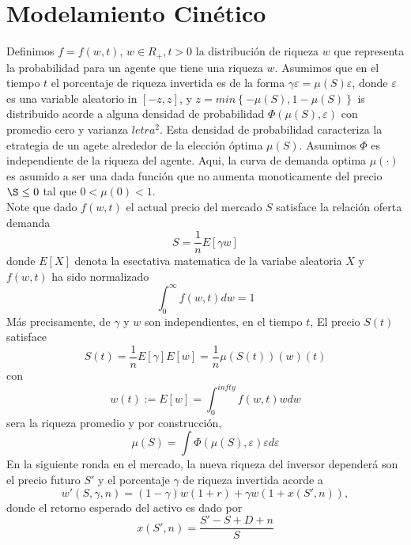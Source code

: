 \documentclass[12pt]{article}
\begin{document}
\section*{Modelamiento Cinético}
\quad Definimos $f = f(w,t)$, $w\in R_{+},t >0$ la distribución de riqueza $w$ que representa la probabilidad para un agente que tiene una riqueza $w$. Asumimos que en el tiempo $t$ el porcentaje de riqueza invertida es de la forma $\gamma{\varepsilon}=\mu(S) \varepsilon$, donde $\varepsilon$ es una variable aleatorio in $[-z,z]$, y $z=min\left\{-\mu(S),1-\mu(S)\right\}$ is distribuido acorde a alguna densidad de probabilidad $\Phi(\mu(S),\varepsilon)$ con promedio cero y varianza $letra^{2}$. Esta densidad de probabilidad caracteriza la etrategia de un agete alrededor de la elección óptima $\mu(S)$. Asumimos $\Phi$ es independiente de la riqueza del agente. Aqui, la curva de demanda optima $\mu(\cdot)$ es asumido a ser una dada función que no aumenta monoticamente del precio $\S\leq 0$ tal que $0< \mu(0)<1$.\\
\quad Note que dado $f(w,t)$ el actual precio del mercado $S$ satisface la relación oferta demanda
\begin{equation}
S=\frac{1}{n}E[\gamma w]
\end{equation} 
donde $E[X]$ denota la esectativa matematica de la variabe aleatoria $X$ y $f(w,t)$ ha sido normalizado
\begin{equation}
\int^{\infty}_{0}f(w,t)dw = 1
\end{equation}
Más precisamente, de $\gamma$ y $w$ son independientes, en el tiempo $t$, El precio $S(t)$ satisface 
\begin{equation}
S(t)=\frac{1}{n}E[\gamma] E[w]=\frac{1}{n}\mu(S(t))(w)(t)\label{ec12}
\end{equation} 
con \begin{equation}
w(t){:=} E[w] = \int^{infty}_{0}f(w,t)wdw
\end{equation}
sera la riqueza promedio y por construcción,
\begin{equation}
\mu(S)=\int\Phi(\mu(S),\varepsilon)\varepsilon d\varepsilon
\end{equation}
\quad En la siguiente ronda en el mercado, la nueva riqueza del inversor dependerá son el precio futuro $S'$ y el porcentaje $\gamma$ de riqueza invertida acorde a
\begin{equation}
w'(S,\gamma,n)=(1-\gamma)w(1+r)+\gamma w(1+x(S',n)),
\end{equation}
donde el retorno esperado del activo es dado por
\begin{equation}
x(S',n)=\frac{S'-S+D+n}{S}\label{ec15}
\end{equation}
\end{document}
